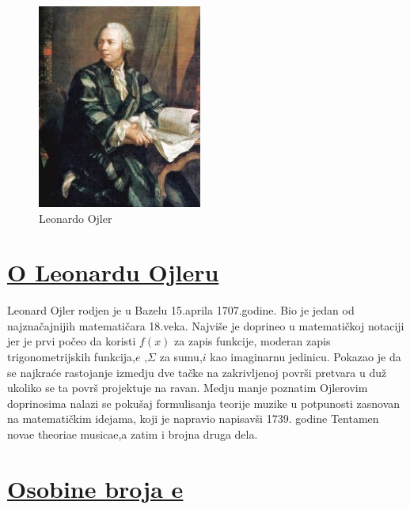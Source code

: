 \documentclass{article}
\begin{document}
\paragraph{}


\begin{figure}
  \begin{center}
    \includegraphics[width=0.48\textwidth]{lojlermodified.jpg}
  \end{center}
  \caption{Leonardo Ojler}
\end{figure}

\section*{\uline{O Leonardu Ojleru}}

Leonard Ojler rodjen je u Bazelu 15.aprila 1707.godine.
Bio je jedan od najznačajnijih matematičara 18.veka.
Najviše je doprineo u matematičkoj notaciji jer je prvi počeo
da koristi $f(x)$ za zapis funkcije, moderan zapis trigonometrijskih funkcija,$e$ ,$\Sigma$
za sumu,$i$ kao imaginarnu jedinicu.
Pokazao je da se najkraće rastojanje izmedju dve tačke na zakrivljenoj površi pretvara u duž ukoliko se ta površ projektuje na ravan.
Medju manje poznatim Ojlerovim doprinosima nalazi se pokušaj formulisanja teorije muzike u potpunosti zasnovan na matematičkim idejama, koji je napravio napisavši 1739. godine Tentamen novae theoriae musicae,a zatim i brojna druga dela.
\newpage{}
\section*{\underline{Osobine broja e}}
	
\end{document}
